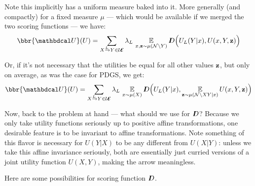 \documentclass{article}
\newcommand\UEd{\mathcal U\!\!\Ed}
\begin{document}
    Note this implicitly has a uniform measure baked into it. More generally (and compactly) for a fixed measure $\mu$ --- which would be available if we merged the two scoring functions --- we have:
    \begin{equation}
        \bbr{\dg U}(U) =
             \sum_{\ed LXY \in \UEd} \lambda_L\, \Ex_{\substack{x,\mat z \sim \mu(\N \setminus Y)}}
             \thickD\Big( U_L(Y | x),  U(x,Y, \mat z) \Big)
    \end{equation}

    Or, if it's not necessary that the utilities be equal for all other values $\mathbf{z}$, but only on average, as was the case for PDGS, we get:
    \begin{equation}
        \bbr{\dg U}(U) =
             \sum_{\ed LXY \in \UEd} \lambda_L\, \Ex_{x \sim \mu(X)}
             \thickD\Big( U_L(Y | x),  \Ex_{\mat z \sim \mu(\N\setminus XY|x)}U(x,Y, \mat z) \Big)
    \end{equation}


    Now, back to the problem at hand --- what should we use for $I\mkern-8muD$? Because we only take utility functions seriously up to positive affine transformations, one desirable feature is to be invariant to affine transformations.
    Note something of this flavor is necessary for $U(Y|X)$ to be any different from $U(X|Y)$: unless we take this affine invariance seriously, both are essentially just curried versions of a joint utility function $U(X,Y)$, making the arrow meaningless.

    Here are some possibilities for scoring function $I\mkern-8muD$.
\end{document}
